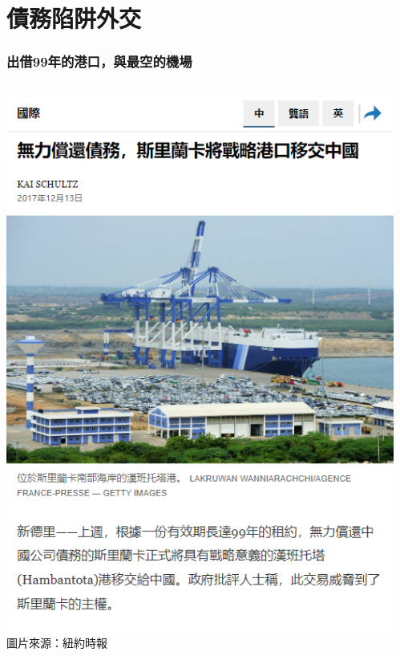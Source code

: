 \documentclass[mathserif]{beamer}
\begin{document}
    \section{債務陷阱外交}
    \begin{frame}
        \frametitle{出借99年的港口，與最空的機場}
        \begin{columns}
            \begin{column}{0.48\textwidth}
                    \includegraphics[width = \textwidth]{fig/Hambontota_news.png}
                    \footnotesize {圖片來源：紐約時報}
            \end{column}%
            \pause%
            \begin{column}{0.48\textwidth}

\end{column}
\end{columns}
\end{frame}
\end{document}
